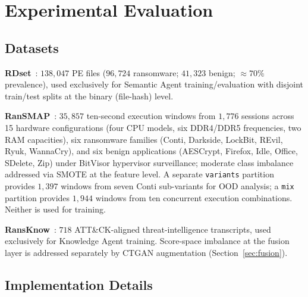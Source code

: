 \documentclass[journal]{IEEEtran}
\begin{document}
\section{Experimental Evaluation}\label{sec:eval}

\subsection{Datasets}\label{sec:datasets}

\textbf{RDset}~\cite{kabuye2025explainable,mathur2020ransomware}:
$138{,}047$ PE files ($96{,}724$ ransomware; $41{,}323$ benign; $\approx\!70\%$
prevalence), used exclusively for Semantic Agent training/evaluation with
disjoint train/test splits at the binary (file-hash) level.

\textbf{RanSMAP}~\cite{hirano2025ransmap}: $35{,}857$ ten-second execution
windows from $1{,}776$ sessions across 15 hardware configurations (four
CPU models, six DDR4/DDR5 frequencies, two RAM capacities), six
ransomware families
(Conti, Darkside, LockBit, REvil, Ryuk, WannaCry), and six benign
applications (AESCrypt, Firefox, Idle, Office, SDelete, Zip) under BitVisor
hypervisor surveillance; moderate class imbalance addressed via SMOTE
at the feature level. A separate \texttt{variants} partition provides
$1{,}397$ windows from seven Conti sub-variants for OOD analysis; a
\texttt{mix} partition provides $1{,}944$ windows from ten concurrent
execution combinations. Neither is used for training.

\textbf{RansKnow}~\cite{ransknow_2026}: $718$ ATT\&CK-aligned
threat-intelligence transcripts, used exclusively for Knowledge Agent
training. Score-space imbalance at the fusion layer is addressed
separately by CTGAN augmentation (Section~\ref{sec:fusion}).

\subsection{Implementation Details}
\end{document}
